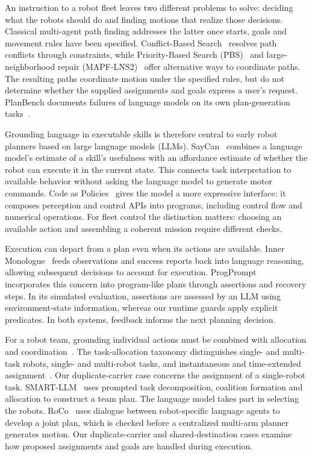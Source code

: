 \documentclass[pdflatex,sn-mathphys-num]{sn-jnl}
\begin{document}
An instruction to a robot fleet leaves two different problems to solve:
deciding what the robots should do and finding motions that realize those
decisions. Classical multi-agent path finding addresses the latter once
starts, goals and movement rules have been specified. Conflict-Based
Search~\citep{cbs} resolves path conflicts through constraints, while
Priority-Based Search (PBS)~\citep{pbs} and large-neighborhood repair
(MAPF-LNS2)~\citep{lns2}
offer alternative ways to coordinate paths. The resulting paths
coordinate motion under the specified rules, but do not determine whether
the supplied assignments and goals express a
user's request. PlanBench documents failures of language models on its
own plan-generation tasks~\citep{planbench}.

Grounding language in executable skills is therefore central to early
robot planners based on large language models (LLMs). SayCan~\citep{saycan} combines a language model's
estimate of a skill's usefulness with an affordance estimate of whether the
robot can execute it in the current state. This connects task interpretation
to available behavior without asking the language model to generate motor
commands. Code as Policies~\citep{codeaspolicies} gives the model a more
expressive interface: it composes perception and control APIs into programs,
including control flow and numerical operations. For fleet control the
distinction matters: choosing an available action and assembling a coherent
mission require different checks.

Execution can depart from a plan even when its actions are available. Inner
Monologue~\citep{innermono} feeds observations and success reports back into
language reasoning, allowing subsequent decisions to account for execution.
ProgPrompt~\citep{progprompt} incorporates this concern into program-like
plans through assertions and recovery steps. In its simulated evaluation,
assertions are assessed by an LLM using environment-state information,
whereas our runtime guards apply explicit predicates. In both systems,
feedback informs the next planning decision.

For a robot team, grounding individual actions must be combined with
allocation and coordination~\citep{mrssurvey}.
The task-allocation taxonomy distinguishes single- and multi-task robots,
single- and multi-robot tasks, and instantaneous and time-extended
assignment~\citep{mrta}. Our duplicate-carrier case concerns the assignment
of a single-robot task. SMART-LLM~\citep{smartllm}
uses prompted task decomposition, coalition formation and allocation to
construct a team plan. The language model takes part in selecting the robots.
RoCo~\citep{roco} uses dialogue between robot-specific language agents to
develop a joint plan, which is checked before a centralized multi-arm planner
generates motion. Our duplicate-carrier and shared-destination cases examine
how proposed assignments and goals are handled during execution.
\end{document}
